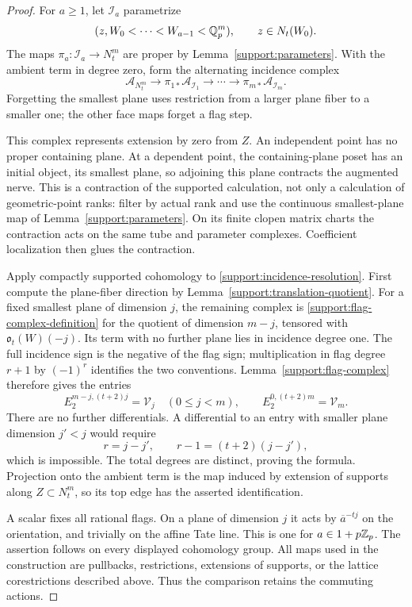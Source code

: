\begin{proof}
For $a\geq1$, let $\mathcal I_a$ parametrize
\[
 (z,W_0<\cdots<W_{a-1}<\mathbb Q_p^m),\qquad z\in N_t(W_0).
\]
The maps $\pi_a:\mathcal I_a\to N_t^m$ are proper by
Lemma~\ref{support:parameters}.  With the ambient term in degree
zero, form the alternating incidence complex
\begin{equation}\label{support:incidence-resolution}
 \mathscr A_{N_t^m}\longrightarrow
 \pi_{1*}\mathscr A_{\mathcal I_1}\longrightarrow\cdots
 \longrightarrow\pi_{m*}\mathscr A_{\mathcal I_m}.
\end{equation}
Forgetting the smallest plane uses restriction from a larger
plane fiber to a smaller one; the other face maps forget a flag
step.

This complex represents extension by zero from $Z$.  An
independent point has no proper containing plane.  At a dependent
point, the containing-plane poset has an initial object, its
smallest plane, so adjoining this plane contracts the augmented
nerve.  This is a contraction of the supported calculation, not
only a calculation of geometric-point ranks: filter by actual
rank and use the continuous smallest-plane map of
Lemma~\ref{support:parameters}.  On its finite clopen matrix
charts the contraction acts on the same tube and parameter
complexes.  Coefficient localization then glues the contraction.

Apply compactly supported cohomology to
\eqref{support:incidence-resolution}.  First compute the
plane-fiber direction by Lemma~\ref{support:translation-quotient}.
For a fixed smallest plane of dimension $j$, the remaining
complex is \eqref{support:flag-complex-definition} for the
quotient of dimension $m-j$, tensored with
$\mathfrak o_t(W)(-j)$.  Its term with no further plane lies in
incidence degree one.  The full incidence sign is the negative
of the flag sign; multiplication in flag degree $r+1$ by
$(-1)^r$ identifies the two conventions.  Lemma~\ref{support:flag-complex}
therefore gives the entries
\[
 E_2^{m-j,(t+2)j}=\mathcal V_j\quad(0\leq j<m),
 \qquad E_2^{0,(t+2)m}=\mathcal V_m.
\]
There are no further differentials.  A differential to an entry
with smaller plane dimension $j'<j$ would require
\[
 r=j-j',\qquad r-1=(t+2)(j-j'),
\]
which is impossible.  The total degrees are distinct, proving
the formula.  Projection onto the ambient term is the map induced
by extension of supports along $Z\subset N_t^m$, so its top edge
has the asserted identification.

A scalar fixes all rational flags.  On a plane of dimension $j$
it acts by $\overline a^{-tj}$ on the orientation, and trivially
on the affine Tate line.  This is one for $a\in1+p\mathbb Z_p$.
The assertion follows on every displayed cohomology group.
All maps used in the construction are pullbacks, restrictions,
extensions of supports, or the lattice corestrictions described
above.  Thus the comparison retains the commuting actions.
\end{proof}

